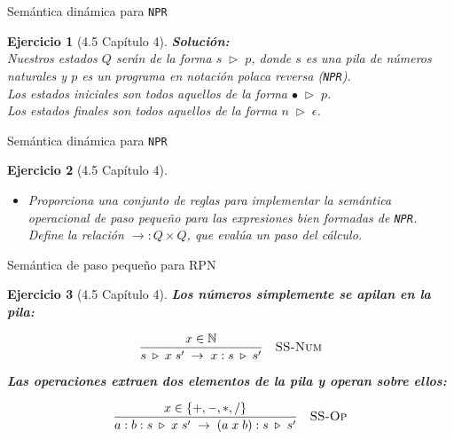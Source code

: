 \documentclass[11pt]{beamer}
\newtheorem{exercise}{Ejercicio}
\begin{document}
\begin{frame}{Semántica dinámica para  \texttt{NPR}}
	\begin{exercise}[4.5 Capítulo 4]
		
	\textbf{Solución:} \\[1em]
	Nuestros estados $Q$ serán de la forma $s \; \triangleright \; p$, donde $s$ es una pila de números naturales y $p$ es un programa en notación polaca reversa (\texttt{NPR}). \\[1em]
	
	Los estados iniciales son todos aquellos de la forma $\bullet \; \triangleright \; p$. \\[1em]
	
	Los estados finales son todos aquellos de la forma $n \; \triangleright \; \epsilon$. \\[1em]
		
	\end{exercise}
\end{frame}


\begin{frame}{Semántica dinámica para  \texttt{NPR}}
	\begin{exercise}[4.5 Capítulo 4]
		\begin{itemize}
			\item Proporciona una conjunto de reglas para implementar la semántica operacional de paso pequeño para las expresiones bien formadas de \texttt{NPR}. Define la relación $\rightarrow : Q \times Q$, que evalúa un paso del cálculo.
		\end{itemize}
	\end{exercise}	
\end{frame}

\begin{frame}{Semántica de paso pequeño para RPN}
	
	\vspace{0.4cm}
	
	\begin{exercise}[4.5 Capítulo 4]
		
		\textbf{Los números simplemente se apilan en la pila:}
		
		\[
		\frac{x \in \mathbb{N}}
		{s \;\triangleright\; x \; s' \;\rightarrow\; x : s \;\triangleright\; s'}
		\quad \textsc{SS-Num}
		\]
		
		\vspace{0.4cm}
		
		\textbf{Las operaciones extraen dos elementos de la pila y operan sobre ellos:}
		
		\[
		\frac{x \in \{+,-,\ast,/\}}
		{a : b : s \;\triangleright\; x \; s' \;\rightarrow\; (a \; x \; b) : s \;\triangleright\; s'}
		\quad \textsc{SS-Op}
		\]
		
	\end{exercise}
	
\end{frame}
\end{document}
